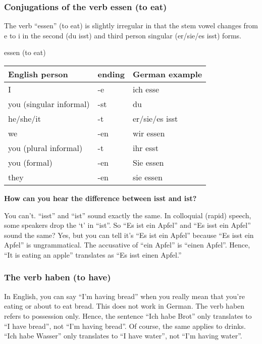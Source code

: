 \pagebreak
\subsubsection{Conjugations of the verb essen (to eat)}

The verb ``essen'' (to eat) is slightly irregular in that the stem vowel changes from e to i in the second (du isst) and third person singular (er/sie/es isst) forms.

\begin{center}  essen (to eat) \end{center}

\begin{center}\begin{tabular}{l|l|l}
  \textbf{English person} & \textbf{ending} & \textbf{German example} \\
	\hline
	I & -e & ich esse \\
	\hline
	you (singular informal) & -st & du \Red{isst} \\
	\hline
	he/she/it & -t & er/sie/es isst \\
	\hline
	we & -en & wir essen \\
	\hline
	you (plural informal) & -t & ihr esst \\
	\hline
	you (formal) & -en & Sie essen \\
	\hline
	they & -en & sie essen \\
\end{tabular}\end{center}

\textbf{How can you hear the difference between isst and ist?}

You can't. ``isst'' and ``ist'' sound exactly the same. In colloquial (rapid) speech, some speakers drop the `t' in ``ist''.  So ``Es ist ein Apfel'' and ``Es isst ein Apfel'' sound the same?  Yes, but you can tell it's ``Es ist ein Apfel'' because ``Es isst ein Apfel'' is ungrammatical. The accusative of ``ein Apfel'' is ``einen Apfel''. Hence, ``It is eating an apple'' translates as ``Es isst einen Apfel.''

\subsubsection{The verb haben (to have)}

In English, you can say ``I'm having bread'' when you really mean that you're eating or about to eat bread. This does not work in German. The verb haben refers to possession only. Hence, the sentence ``Ich habe Brot'' only translates to ``I have bread'', not ``I'm having bread''. Of course, the same applies to drinks. ``Ich habe Wasser'' only translates to ``I have water'', not ``I'm having water''.

